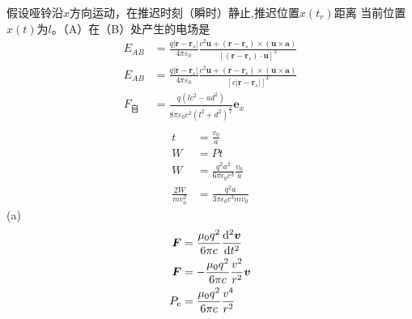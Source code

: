 假设哑铃沿$x$方向运动，在推迟时刻（瞬时）静止,推迟位置$x(t_r)$距离
当前位置$x(t)$为$l$。（A）在（B）处产生的电场是
\begin{align}
    E_{AB}&=\frac{q\left|\boldsymbol{r}-\boldsymbol{r}_s\right|}{4\pi\varepsilon_0} \frac{c^2\boldsymbol{u}+\left(\boldsymbol{r}-\boldsymbol{r}_s\right)\times\left(\boldsymbol{u}\times\boldsymbol{a}\right)}{\left[(\boldsymbol{r}-\boldsymbol{r}_s)\cdot\boldsymbol{u}\right]^3}\nonumber\\
    E_{AB}&=\frac{q\left|\boldsymbol{r}-\boldsymbol{r}_s\right|}{4\pi\varepsilon_0} \frac{c^2\boldsymbol{u}+\left(\boldsymbol{r}-\boldsymbol{r}_s\right)\times\left(\boldsymbol{u}\times\boldsymbol{a}\right)}{\left[c\left|\boldsymbol{r}-\boldsymbol{r}_s\right|\right]^3}\nonumber\\
    F_{\text{自}}&=\frac{q(lc^2-ad^2)}{8\pi\varepsilon_0c^2\left(l^2+d^2\right)^\frac{3}{2}}\boldsymbol{e}_x\\
\end{align}
\begin{align*}
    t&=\frac{v_0}{a}\\
    W&=Pt\\
    W&=\frac{q^2a^2}
    {6\pi\epsilon_0c^3}\frac{v_0}{a}\\
    \frac{2W}{mv_0^2}&=\frac{q^2a}
    {3\pi\epsilon_0c^3mv_0}
\end{align*}
(a)\begin{align*}
    \boldsymbol F&=\frac{\mu_0q^2}{6\pi c}\frac{\dif^2\boldsymbol{v}}{\dif t^2}\\
    \boldsymbol F&=-\frac{\mu_0q^2}{6\pi c}\frac{v^2}{r^2}\boldsymbol{v}\\
    P_e&=\frac{\mu_0q^2}{6\pi c}\frac{v^4}{r^2}
\end{align*}

